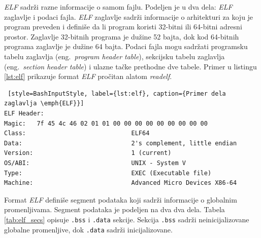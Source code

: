 \documentclass[12pt,oneside]{memoir}
\begin{document}
\emph{ELF} sadrži razne informacije o samom fajlu. Podeljen je u dva dela: \emph{ELF} zaglavlje i podaci fajla. \emph{ELF} zaglavlje sadrži informacije o arhitekturi za koju je program preveden i definiše da li program koristi 32-bitni ili 64-bitni adresni prostor. Zaglavlje 32-bitnih programa je dužine 52 bajta, dok kod 64-bitnih programa zaglavlje je dužine 64 bajta. Podaci fajla mogu sadržati programsku tabelu zaglavlja (eng.~\emph{program header table}), sekcijsku tabelu zaglavlja (eng.~\emph{section header table}) i ulazne tačke prethodne dve tabele. Primer u listingu \ref{lst:elf} prikazuje format \emph{ELF} pročitan alatom \emph{readelf}.

\begin{lstlisting} [style=BashInputStyle, label={lst:elf}, caption={Primer dela zaglavlja \emph{ELF}}]
ELF Header:
Magic:   7f 45 4c 46 02 01 01 00 00 00 00 00 00 00 00 00 
Class:                             ELF64
Data:                              2's complement, little endian
Version:                           1 (current)
OS/ABI:                            UNIX - System V
Type:                              EXEC (Executable file)
Machine:                           Advanced Micro Devices X86-64
\end{lstlisting}

Format \emph{ELF} definiše segment podataka koji sadrži informacije o globalnim promenljivama. Segment podataka je podeljen na dva dva dela. Tabela \ref{tab:elf_secs} opisuje \texttt{.bss} i \texttt{.data} sekcije. Sekcija \texttt{.bss} sadrži neinicijalizovane globalne promenljive, dok \texttt{.data} sadrži inicijalizovane. 
\end{document}
